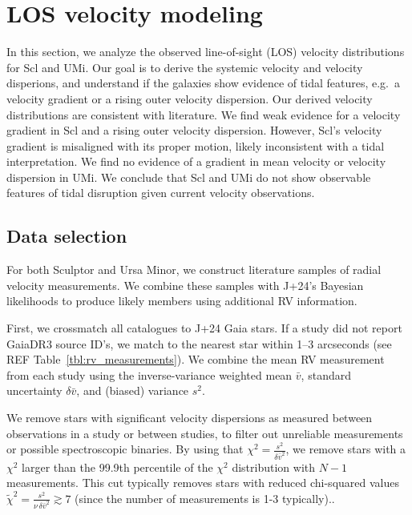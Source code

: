 \chapter{LOS velocity modeling}\label{sec:rv_obs}

In this section, we analyze the observed line-of-sight (LOS) velocity
distributions for Scl and UMi. Our goal is to derive the systemic
velocity and velocity disperions, and understand if the galaxies show
evidence of tidal features, e.g.~a velocity gradient or a rising outer
velocity dispersion. Our derived velocity distributions are consistent
with literature. We find weak evidence for a velocity gradient in Scl
and a rising outer velocity dispersion. However, Scl's velocity gradient
is misaligned with its proper motion, likely inconsistent with a tidal
interpretation. We find no evidence of a gradient in mean velocity or
velocity dispersion in UMi. We conclude that Scl and UMi do not show
observable features of tidal disruption given current velocity
observations.

\section{Data selection}\label{data-selection}

For both Sculptor and Ursa Minor, we construct literature samples of
radial velocity measurements. We combine these samples with J+24's
Bayesian likelihoods to produce likely members using additional RV
information.

First, we crossmatch all catalogues to J+24 Gaia stars. If a study did
not report GaiaDR3 source ID's, we match to the nearest star within 1--3
arcseconds (see REF Table~\ref{tbl:rv_measurements}). We combine the
mean RV measurement from each study using the inverse-variance weighted
mean \(\bar v\), standard uncertainty \(\delta \bar v\), and (biased)
variance \(s^2\).

We remove stars with significant velocity dispersions as measured
between observations in a study or between studies, to filter out
unreliable measurements or possible spectroscopic binaries. By using
that \(\chi^2=\frac{s^2}{\delta \bar v^2}\), we remove stars with a
\(\chi^2\) larger than the 99.9th percentile of the \(\chi^2\)
distribution with \(N-1\) measurements. This cut typically removes stars
with reduced chi-squared values
\(\tilde\chi^2  = \frac{s^2}{\nu\,\delta \bar v^2}\gtrsim 7\) (since the
number of measurements is 1-3 typically)..

